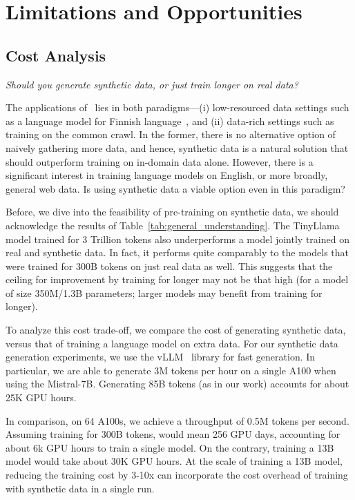 \section{Limitations and Opportunities}

\subsection{Cost Analysis}
\emph{Should you generate synthetic data, or just train longer on real data?}

The applications of \ours~lies in both paradigms---(i) low-resourced data settings such as a language model for Finnish language~\citep{luukkonen2023fingpt}, and (ii) data-rich settings such as training on the common crawl.
In the former, there is no alternative option of naively gathering more data, and hence, synthetic data is a natural solution that should outperform training on in-domain data alone. However, there is a significant interest in training language models on English, or more broadly, general web data. Is using synthetic data a viable option even in this paradigm?

Before, we dive into the feasibility of pre-training on synthetic data, we should acknowledge the results of Table~\ref{tab:general_understanding}. The TinyLlama model trained for 3 Trillion tokens also underperforms a model jointly trained on real and synthetic data. In fact, it performs quite comparably to the models that were trained for 300B tokens on just real data as well. This suggests that the ceiling for improvement by training for longer may not be that high (for a model of size 350M/1.3B parameters; larger models may benefit from training for longer).

To analyze this cost trade-off, we compare the cost of generating synthetic data, versus that of training a language model on extra data.
For our synthetic data generation experiments, we use the vLLM~\citep{kwon2023efficient} library for fast generation. In particular, we are able to generate 3M tokens per hour on a single A100 when using the Mistral-7B. Generating 85B tokens (as in our work) accounts for about 25K GPU hours. 

In comparison, on 64 A100s, we achieve a throughput of 0.5M tokens per second. Assuming training for 300B tokens, would mean 256 GPU days, accounting for about 6k GPU hours to train a single model. On the contrary, training a 13B model would take about 30K GPU hours. At the scale of training a 13B model, reducing the training cost by 3-10x can incorporate the cost overhead of training with synthetic data in a single run. 



